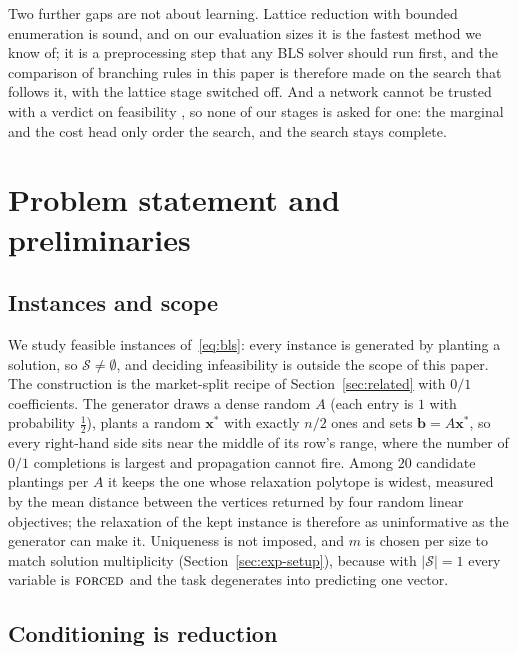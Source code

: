 \documentclass[final,5p,times,twocolumn,authoryear]{elsarticle}
\newcommand{\SOL}{\mathcal{S}}
\newcommand{\FORCED}{\textsc{forced}}
\begin{document}
Two further gaps are not about learning. Lattice reduction with bounded enumeration \citep{aardal2000market,wassermann2025solving} is sound, and on our evaluation sizes it is the fastest method we know of; it is a preprocessing step that any BLS solver should run first, and the comparison of branching rules in this paper is therefore made on the search that follows it, with the lattice stage switched off. And a network cannot be trusted with a verdict on feasibility \citep{selsam2019neurosat,chen2023representing}, so none of our stages is asked for one: the marginal and the cost head only order the search, and the search stays complete.

\section{Problem statement and preliminaries}
\label{sec:problem}

\subsection{Instances and scope}
\label{sec:problem-instances}

We study feasible instances of~\eqref{eq:bls}: every instance is generated by planting a solution, so $\SOL\neq\emptyset$, and deciding infeasibility is outside the scope of this paper. The construction is the market-split recipe of Section~\ref{sec:related} with $0/1$ coefficients. The generator draws a dense random $A$ (each entry is $1$ with probability $\frac12$), plants a random $\mathbf{x}^\ast$ with exactly $n/2$ ones and sets $\mathbf{b}=A\mathbf{x}^\ast$, so every right-hand side sits near the middle of its row's range, where the number of $0/1$ completions is largest and propagation cannot fire. Among $20$ candidate plantings per $A$ it keeps the one whose relaxation polytope is widest, measured by the mean distance between the vertices returned by four random linear objectives; the relaxation of the kept instance is therefore as uninformative as the generator can make it. Uniqueness is not imposed, and $m$ is chosen per size to match solution multiplicity (Section~\ref{sec:exp-setup}), because with $|\SOL|=1$ every variable is $\FORCED$ and the task degenerates into predicting one vector.

\subsection{Conditioning is reduction}
\label{sec:problem-reduce}
\end{document}
